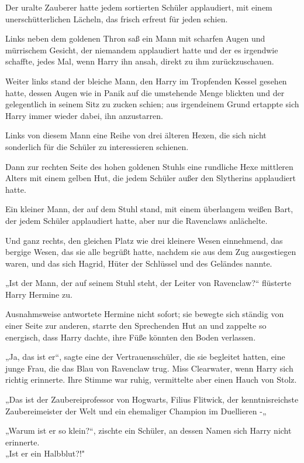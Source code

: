 {Der uralte Zauberer hatte jedem sortierten Schüler applaudiert, mit einem unerschütterlichen Lächeln, das frisch erfreut für jeden schien.

Links neben dem goldenen Thron saß ein Mann mit scharfen Augen und mürrischem Gesicht, der niemandem applaudiert hatte und der es irgendwie schaffte, jedes Mal, wenn Harry ihn ansah, direkt zu ihm zurückzuschauen.

Weiter links stand der bleiche Mann, den Harry im Tropfenden Kessel gesehen hatte, dessen Augen wie in Panik auf die umstehende Menge blickten und der gelegentlich in seinem Sitz zu zucken schien; aus irgendeinem Grund ertappte sich Harry immer wieder dabei, ihn anzustarren.

Links von diesem Mann eine Reihe von drei älteren Hexen, die sich nicht sonderlich für die Schüler zu interessieren schienen.

Dann zur rechten Seite des hohen goldenen Stuhls eine rundliche Hexe mittleren Alters mit einem gelben Hut, die jedem Schüler außer den Slytherins applaudiert hatte.

Ein kleiner Mann, der auf dem Stuhl stand, mit einem überlangem weißen Bart, der jedem Schüler applaudiert hatte, aber nur die Ravenclaws anlächelte.

Und ganz rechts, den gleichen Platz wie drei kleinere Wesen einnehmend, das bergige Wesen, das sie alle begrüßt hatte, nachdem sie aus dem Zug ausgestiegen waren, und das sich Hagrid, Hüter der Schlüssel und des Geländes nannte.

„Ist der Mann, der auf seinem Stuhl steht, der Leiter von Ravenclaw?“ flüsterte Harry Hermine zu.

Ausnahmsweise antwortete Hermine nicht sofort; sie bewegte sich ständig von einer Seite zur anderen, starrte den Sprechenden Hut an und zappelte so energisch, dass Harry dachte, ihre Füße könnten den Boden verlassen.

„Ja, das ist er“, sagte eine der Vertrauensschüler, die sie begleitet hatten, eine junge Frau, die das Blau von Ravenclaw trug. Miss Clearwater, wenn Harry sich richtig erinnerte. Ihre Stimme war ruhig, vermittelte aber einen Hauch von Stolz.

„Das ist der Zaubereiprofessor von Hogwarts, Filius Flitwick, der kenntnisreichste Zaubereimeister der Welt und ein ehemaliger Champion im Duellieren -„

„Warum ist er so klein?“, zischte ein Schüler, an dessen Namen sich Harry nicht erinnerte.\\ „Ist er ein Halbblut?!"

}
